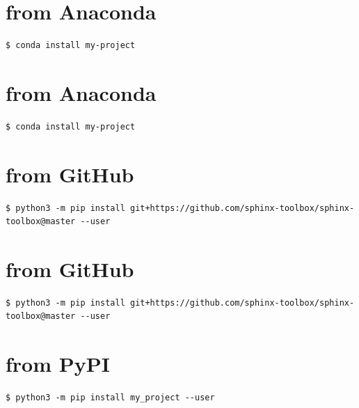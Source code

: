 \documentclass[letterpaper,10pt,english]{sphinxmanual}
\begin{document}
\chapter{from Anaconda}
\label{\detokenize{installation:installation-4-from_Anaconda}}\label{\detokenize{installation:installation-4}}
\begin{Verbatim}[commandchars=\\\{\}]
$ conda install my-project
\end{Verbatim}


\chapter{from Anaconda}
\label{\detokenize{installation:installation-5-from_Anaconda}}\label{\detokenize{installation:installation-5}}
\begin{Verbatim}[commandchars=\\\{\}]
$ conda install my-project
\end{Verbatim}


\chapter{from GitHub}
\label{\detokenize{installation:installation-6-from_GitHub}}\label{\detokenize{installation:installation-6}}
\begin{Verbatim}[commandchars=\\\{\}]
$ python3 -m pip install git+https://github.com/sphinx-toolbox/sphinx-toolbox@master --user
\end{Verbatim}


\chapter{from GitHub}
\label{\detokenize{installation:installation-7-from_GitHub}}\label{\detokenize{installation:installation-7}}
\begin{Verbatim}[commandchars=\\\{\}]
$ python3 -m pip install git+https://github.com/sphinx-toolbox/sphinx-toolbox@master --user
\end{Verbatim}


\chapter{from PyPI}
\label{\detokenize{installation:installation-8-from_PyPI}}\label{\detokenize{installation:installation-8}}
\begin{Verbatim}[commandchars=\\\{\}]
$ python3 -m pip install my_project --user
\end{Verbatim}
\end{document}
